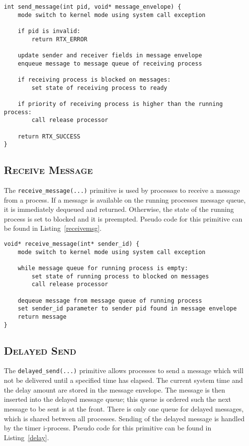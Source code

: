 \documentclass[oneside]{report}
\begin{document}
\begin{lstlisting}
int send_message(int pid, void* message_envelope) {
    mode switch to kernel mode using system call exception

    if pid is invalid:
        return RTX_ERROR

    update sender and receiver fields in message envelope
    enqueue message to message queue of receiving process

    if receiving process is blocked on messages:
        set state of receiving process to ready

    if priority of receiving process is higher than the running process:
        call release processor

    return RTX_SUCCESS
}
\end{lstlisting}

\subsection{\textsc{Receive Message}}

The \texttt{receive\_message(...)} primitive is used by processes to
receive a message from a process. If a message is available on the
running processes message queue, it is immediately dequeued and
returned. Otherwise, the state of the running process is set to
blocked and it is preempted. Pseudo code for this primitive can be
found in Listing~\ref{receivemsg}.

\begin{lstlisting}
void* receive_message(int* sender_id) {
    mode switch to kernel mode using system call exception

    while message queue for running process is empty:
        set state of running process to blocked on messages
        call release processor

    dequeue message from message queue of running process
    set sender_id parameter to sender pid found in message envelope
    return message
}
\end{lstlisting}

\subsection{\textsc{Delayed Send}}

The \texttt{delayed\_send(...)} primitive allows processes to send a
message which will not be delivered until a specified time has
elapsed. The current system time and the delay amount are stored in
the message envelope. The message is then inserted into the delayed
message queue; this queue is ordered such the next message to be sent is at
the front. There is only one queue for delayed messages, which is shared
between all processes. Sending of the delayed message is handled by
the timer i-process. Pseudo code for this primitive can be found in
Listing~\ref{delay}.
\end{document}
